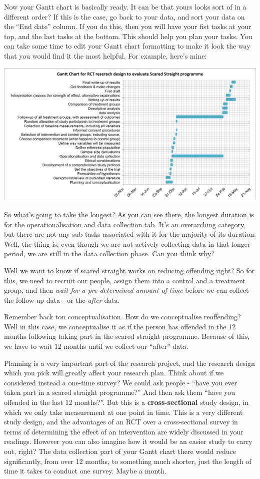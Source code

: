 \documentclass[]{book}
\theoremstyle{definition}
\theoremstyle{definition}
\theoremstyle{definition}
\theoremstyle{remark}
\begin{document}
Now your Gantt chart is basically ready. It can be that yours looks sort
of in a different order? If this is the case, go back to your data, and
sort your data on the ``End date'' column. If you do this, then you will
have your fist tasks at your top, and the last tasks at the bottom. This
should help you plan your tasks. You can take some time to edit your
Gantt chart formatting to make it look the way that you would find it
the most helpful. For example, here's mine:

\includegraphics{imgs/final_gantt.png}

So what's going to take the longest? As you can see there, the longest
duration is for the operationalisation and data collection tab. It's an
overarching category, but there are not any sub-tasks associated with it
for the majority of its duration. Well, the thing is, even though we are
not actively collecting data in that longer period, we are still in the
data collection phase. Can you think why?

Well we want to know if scared straight works on reducing offending
right? So for this, we need to recruit our people, assign them into a
control and a treatment group, and then \emph{wait for a pre-determined
amount of time} before we can collect the follow-up data - or the
\emph{after} data.

Remember back ton conceptualisation. How do we conceptualise
reoffending? Well in this case, we conceptualise it as if the person has
offended in the 12 months following taking part in the scared straight
programme. Because of this, we have to wait 12 months until we collect
our ``after'' data.

Planning is a very important part of the research project, and the
research design which you pick will greatly affect your research plan.
Think about if we considered instead a one-time survey? We could ask
people - ``have you ever taken part in a scared straight programme?''
And then ask them ``have you offended in the last 12 months?''. But this
is a \textbf{cross-sectional} study design, in which we only take
measurement at one point in time. This is a very different study design,
and the advantages of an RCT over a cross-sectional survey in terms of
determining the effect of an intervention are widely discussed in your
readings. However you can also imagine how it would be an easier study
to carry out, right? The data collection part of your Gantt chart there
would reduce significantly, from over 12 months, to something much
shorter, just the length of time it takes to conduct one survey. Maybe a
month.
\end{document}

